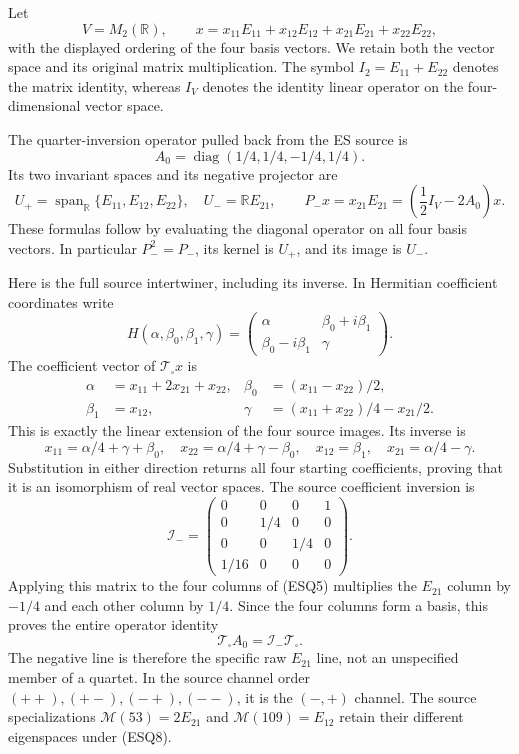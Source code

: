 \documentclass[
  10pt,
  a4paper,
]{article}
\begin{document}
Let \[
V=M_2(\mathbb R),\qquad
x=x_{11}E_{11}+x_{12}E_{12}+x_{21}E_{21}+x_{22}E_{22},
\tag{ESQ1}
\] with the displayed ordering of the four basis vectors. We retain both
the vector space and its original matrix multiplication. The symbol
\(I_2=E_{11}+E_{22}\) denotes the matrix identity, whereas \(I_V\)
denotes the identity linear operator on the four-dimensional vector
space.

The quarter-inversion operator pulled back from the ES source is \[
A_0=\operatorname{diag}(1/4,1/4,-1/4,1/4).
\tag{ESQ2}
\] Its two invariant spaces and its negative projector are \[
U_+=\operatorname{span}_{\mathbb R}\{E_{11},E_{12},E_{22}\},
\quad U_-=\mathbb RE_{21},\qquad
P_-x=x_{21}E_{21}=\left(\frac12I_V-2A_0\right)x.
\tag{ESQ3}
\] These formulas follow by evaluating the diagonal operator on all four
basis vectors. In particular \(P_-^2=P_-\), its kernel is \(U_+\), and
its image is \(U_-\).

Here is the full source intertwiner, including its inverse. In Hermitian
coefficient coordinates write \[
H(\alpha,\beta_0,\beta_1,\gamma)
=\begin{pmatrix}\alpha&\beta_0+i\beta_1\\
\beta_0-i\beta_1&\gamma\end{pmatrix}.
\tag{ESQ4}
\] The coefficient vector of \(\mathcal T_\square x\) is \[
\begin{aligned}
\alpha&=x_{11}+2x_{21}+x_{22},&
\beta_0&=(x_{11}-x_{22})/2,\\
\beta_1&=x_{12},&
\gamma&=(x_{11}+x_{22})/4-x_{21}/2.
\end{aligned}
\tag{ESQ5}
\] This is exactly the linear extension of the four source images. Its
inverse is \[
x_{11}=\alpha/4+\gamma+\beta_0,\quad
x_{22}=\alpha/4+\gamma-\beta_0,\quad
x_{12}=\beta_1,\quad x_{21}=\alpha/4-\gamma.
\tag{ESQ6}
\] Substitution in either direction returns all four starting
coefficients, proving that it is an isomorphism of real vector spaces.
The source coefficient inversion is \[
\mathcal I_-=
\begin{pmatrix}
0&0&0&1\\0&1/4&0&0\\0&0&1/4&0\\1/16&0&0&0
\end{pmatrix}.
\tag{ESQ7}
\] Applying this matrix to the four columns of (ESQ5) multiplies the
\(E_{21}\) column by \(-1/4\) and each other column by \(1/4\). Since
the four columns form a basis, this proves the entire operator identity
\[
\mathcal T_\square A_0=\mathcal I_-\mathcal T_\square.
\tag{ESQ8}
\] The negative line is therefore the specific raw \(E_{21}\) line, not
an unspecified member of a quartet. In the source channel order
\((++),(+-),(-+),(--)\), it is the \((-,+)\) channel. The source
specializations \(\mathcal M(53)=2E_{21}\) and
\(\mathcal M(109)=E_{12}\) retain their different eigenspaces under
(ESQ8).
\end{document}
